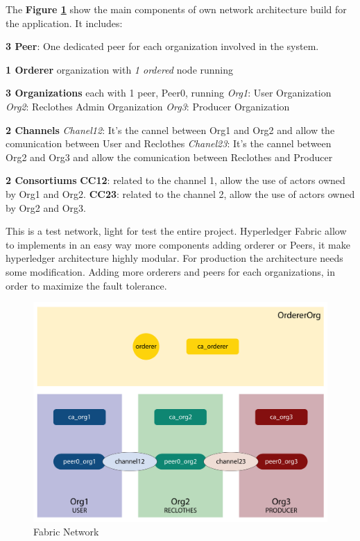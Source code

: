 The \textbf{Figure \ref{fig:fabric_network}} show the main components of own network architecture 
build for the application. It includes:

\begin{outline}[enumerate]
    \1 \textbf{3 Peer}: One dedicated peer for each organization involved in the system. 

    \1 \textbf{1 Orderer} organization with \textit{1 ordered} node running

    \1 \textbf{3 Organizations} each with 1 peer, Peer0, running
    \2 \textit{Org1}: User Organization
    \2 \textit{Org2}: Reclothes Admin Organization 
    \2 \textit{Org3}: Producer Organization

    \1 \textbf{2 Channels}
    \2 \textit{Chanel12}: It's the cannel between Org1 and Org2 and allow the comunication between User and Reclothes
    \2 \textit{Chanel23}: It's the cannel between Org2 and Org3 and allow the comunication between Reclothes and Producer

    \1 \textbf{2 Consortiums}
    \1 \textbf{CC12}: related to the channel 1, allow the use of actors owned by Org1 and Org2.
    \1 \textbf{CC23}: related to the channel 2, allow the use of actors owned by Org2 and Org3.
\end{outline}

\bigskip
This is a test network, light for test the entire project. Hyperledger Fabric allow to implements in an easy way more components adding
orderer or Peers, it make hyperledger architecture highly modular. For production the architecture needs some modification.
Adding more orderers and peers for each organizations, in order to maximize the fault tolerance.   

\begin{figure}[h!]
	\centering
	\includegraphics[totalheight=10cm]{img/fabric_network.png}
	\caption{Fabric Network}
	\label{fig:fabric_network}
\end{figure}

